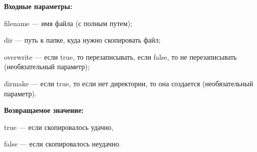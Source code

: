 \textbf{Входные параметры:}

filename --- имя файла (с полным путем);
 
dir --- путь к папке, куда нужно скопировать файл;

overwrite --- если true, то перезаписывать, если false, то не перезаписывать (необязательный параметр);

dirmake --- если true, то если нет директории, то она создается (необязательный параметр).

\textbf{Возвращаемое значение:}

true --- если скопировалось удачно,
 
false --- если скопировалось неудачно.